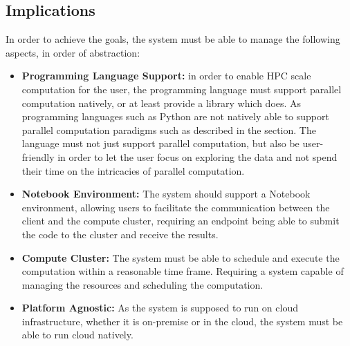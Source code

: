 


\subsection{Implications}

In order to achieve the goals, the system must be able to manage the following aspects, in order of abstraction:

\begin{itemize}
    \item \textbf{Programming Language Support:} in order to enable \ac{HPC} scale computation for the user,
          the programming language must support parallel computation natively, or at least provide a library which does.
          As programming languages such as Python are not natively able to support parallel computation paradigms
          such as described in the  section.
          The language must not just support parallel computation, but also be user-friendly in order to let the user focus on
          exploring the data and not spend their time on the intricacies of parallel computation.
    \item \textbf{Notebook Environment:} The system should support a Notebook environment, allowing users to
          facilitate the communication between the client and the compute cluster, requiring an endpoint being able to submit
          the code to the cluster and receive the results.
    \item \textbf{Compute Cluster:} The system must be able to schedule and execute the computation within a reasonable time frame.
          Requiring a system capable of managing the resources and scheduling the computation.
    \item \textbf{Platform Agnostic:} As the system is supposed to run on cloud infrastructure,
          whether it is on-premise or in the cloud, the system must be able to run cloud natively.
\end{itemize}



